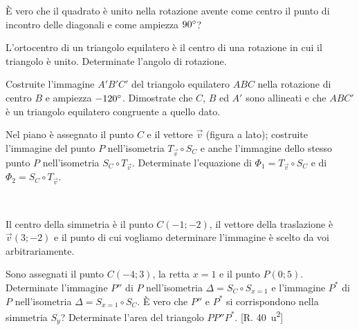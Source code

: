 \begin{esercizio}
\label{ese:8.60} %
\`E vero che il quadrato è unito nella rotazione avente come centro il punto di incontro delle diagonali e come ampiezza $90{}^{\circ}$?
\end{esercizio}

\begin{esercizio}
\label{ese:8.61} %
L'ortocentro di un triangolo equilatero è il centro di una rotazione in cui il triangolo è unito. Determinate l'angolo di rotazione.
\end{esercizio}

\begin{esercizio}
\label{ese:8.62} %
Costruite l'immagine $A'B'C'$ del triangolo equilatero $ABC$ nella rotazione di centro $B$ e ampiezza $-120{}^{\circ}$. Dimostrate che $C$, $B$ ed $A'$ sono allineati e che $ABC'$ è un triangolo equilatero congruente a quello dato.
\end{esercizio}

\noindent\begin{minipage}{0.75\textwidth}\parindent15pt
\begin{esercizio}
\label{ese:8.63} %
Nel piano è assegnato il punto $C$ e il vettore $\vec{v}$ (figura a lato); costruite l'immagine del punto $P$ nell'isometria $T_{\vec{v}} \circ S_{C}$ e anche l'immagine dello stesso punto $P$ nell'isometria $S_{C} \circ T_{\vec{v}}$. Determinate l'equazione di $\Phi_1 = T_{\vec{v}} \circ S_{C}$ e di $\Phi_2 = S_{C} \circ T_{\vec{v}}$.
\end{esercizio}
\end{minipage}\hfil
\begin{minipage}{0.25\textwidth}
	\centering~~
\end{minipage}\vspace{8pt}

\begin{esercizio}
\label{ese:8.64} %
Il centro della simmetria è il punto $C(-1;-2)$, il vettore della traslazione è $\vec{v}(3;-2)$ e il punto di cui vogliamo determinare l'immagine è scelto da voi arbitrariamente. 
\end{esercizio}

\begin{esercizio}
\label{ese:8.65} %
Sono assegnati il punto $C(-4;3)$, la retta $x=1$ e il punto $P(0;5)$. Determinate l'immagine $P''$ di $P$ nell'isometria $\Delta=S_{C}\circ S_{x=1}$ e l'immagine $P^*$ di $P$ nell'isometria $\Delta=S_{x=1}\circ S_{C}$. \`E vero che $P''$ e $P^*$ si corrispondono nella simmetria $S_y$? Determinate l'area del triangolo $PP''P^*$.
[R. 40~u\textsuperscript{2}]
\end{esercizio}

